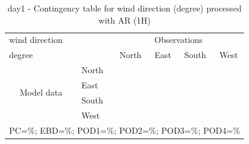 \begin{table}[p!]
\begin{center}
\begin{tabular}{llcccc}
\hline
{wind direction}                                       &                                                    & \multicolumn{4}{c}{Observations}                 \\
{degree}                                       &                             & {North}   & {East} & {South} & {West} \\
\hline
\multicolumn{1}{c}{\multirow{4}{*}{Model data}}  & {North}              &                 &                        &               & \\
                                                 & {East}               &                 &                        &               & \\
                                                 & {South}              &                 &                       &              & \\
                                                 & {West}               &                &                       &              & \\
\hline 
\multicolumn{6}{l}{ PC=\%; EBD=\%; POD1=\%; POD2=\%; POD3=\%; POD4=\%}                 \\
\end{tabular}
\end{center}
\caption{day1 - Contingency table for {wind direction} (degree) processed with AR (1H)}
\label{tab:contingencywdAFT:day1}
\end{table}
